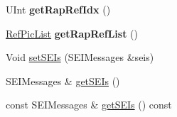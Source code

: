 \begin{DoxyCompactItemize}
U\+Int {\bfseries get\+Rap\+Ref\+Idx} ()
\item 
\mbox{\label{class_t_com_pic_a15c6fbc75fb6ef2d7a04bb5b051783cf}} 
\hyperlink{_type_def_8h_a93cea48eb9dcfd661168dee82e41b384}{Ref\+Pic\+List} {\bfseries get\+Rap\+Ref\+List} ()
\item 
Void \hyperlink{class_t_com_pic_a7621684d3f2806eddff9868fc5f76c4e}{set\+S\+E\+Is} (S\+E\+I\+Messages \&seis)
\item 
S\+E\+I\+Messages \& \hyperlink{class_t_com_pic_ab7bea16171c30ecdfedf0a191b28cafc}{get\+S\+E\+Is} ()
\item 
const S\+E\+I\+Messages \& \hyperlink{class_t_com_pic_a2aaa31be1763985ca743712cbe1cd1d5}{get\+S\+E\+Is} () const
\end{DoxyCompactItemize}
{\bf }\par
